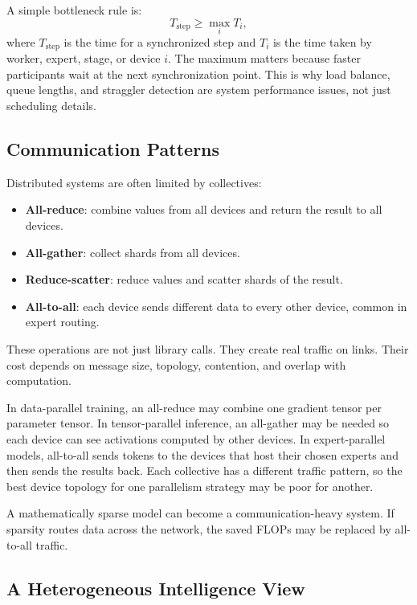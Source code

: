A simple bottleneck rule is:
\[
  T_{\text{step}} \geq \max_i T_i,
\]
where \(T_{\text{step}}\) is the time for a synchronized step and \(T_i\) is the time taken by worker, expert, stage, or device \(i\). The maximum matters because faster participants wait at the next synchronization point. This is why load balance, queue lengths, and straggler detection are system performance issues, not just scheduling details.

\subsection{Communication Patterns}

Distributed systems are often limited by collectives:

\begin{itemize}[leftmargin=*]
  \item \textbf{All-reduce}: combine values from all devices and return the result to all devices.
  \item \textbf{All-gather}: collect shards from all devices.
  \item \textbf{Reduce-scatter}: reduce values and scatter shards of the result.
  \item \textbf{All-to-all}: each device sends different data to every other device, common in expert routing.
\end{itemize}

These operations are not just library calls. They create real traffic on links. Their cost depends on message size, topology, contention, and overlap with computation.

In data-parallel training, an all-reduce may combine one gradient tensor per parameter tensor. In tensor-parallel inference, an all-gather may be needed so each device can see activations computed by other devices. In expert-parallel models, all-to-all sends tokens to the devices that host their chosen experts and then sends the results back. Each collective has a different traffic pattern, so the best device topology for one parallelism strategy may be poor for another.

\begin{aside}
A mathematically sparse model can become a communication-heavy system. If sparsity routes data across the network, the saved FLOPs may be replaced by all-to-all traffic.
\end{aside}

\subsection{A Heterogeneous Intelligence View}

